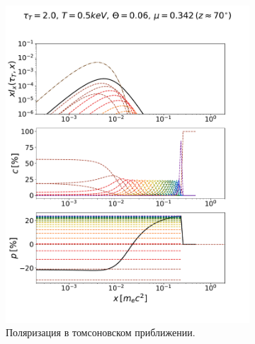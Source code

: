 \documentclass[14pt,a4paper]{extarticle}
\begin{document}
			\begin{figure}[H]
				\centering
				\begin{subfigure}{.5\textwidth}
					\centering
					\includegraphics[width=\textwidth]{TM9z70.pdf}
					\caption{\small\centering Поляризация в томсоновском приближении.}
				\end{subfigure}%
				\begin{subfigure}{.5\textwidth}
					\centering

\end{subfigure}
\end{figure}
\end{document}
